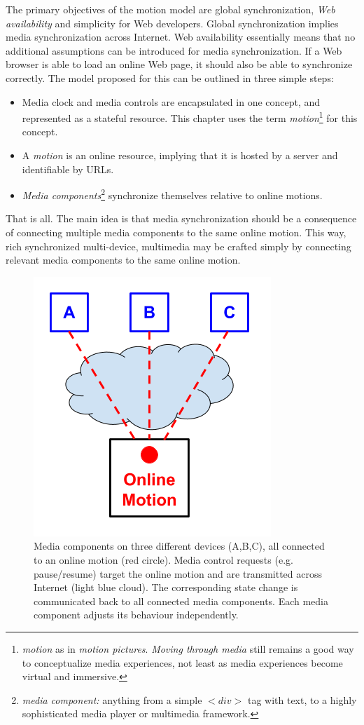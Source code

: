 The primary objectives of the motion model are global synchronization, \emph{Web
availability} and simplicity for Web developers. Global synchronization implies
media synchronization across Internet. Web availability essentially means
that no additional assumptions can be introduced for media synchronization. If a Web browser is able
to load an online Web page, it should also be able to synchronize correctly.
The model proposed for this can be outlined in three simple steps:

\begin{itemize}
\item{Media clock and media controls are encapsulated in one concept, and
represented as a stateful resource. This chapter uses the term \emph{motion}\footnote{\emph{motion} as in \emph{motion pictures}. \emph{Moving through media} still remains a good way to conceptualize media experiences, not least as media experiences become virtual and immersive.
} for this
concept.} 
\item{A \emph{motion} is an online resource, implying that it is hosted by a
server and identifiable by URLs.}
\item{\emph{Media components}\footnote{\emph{media component:} anything from a simple $<div>$ tag with text, to a highly sophisticated media player or multimedia framework.
} synchronize themselves relative to online motions.}
\end{itemize}

That is all. The main idea is that media synchronization should be a
consequence of connecting multiple media components to the same online motion.
This way, rich synchronized multi-device, multimedia may be crafted simply by
connecting relevant media components to the same online motion.

\begin{figure}[h]
\centering
\includegraphics[scale=.4]{fig/motion-model.png}
\caption{Media components on three different devices (A,B,C), all connected to an online motion
(red circle). Media control requests (e.g. pause/resume) target the online motion and are transmitted across Internet (light blue cloud). The corresponding state change is
communicated back to all connected media components. Each media component
adjusts its behaviour independently.}
\label{fig:model}
\end{figure}

